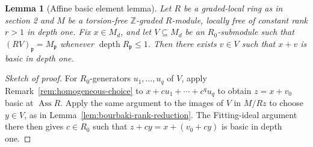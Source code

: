 \documentclass[11pt,letterpaper]{amsart}
\DeclareMathOperator{\Ass}{Ass}
\DeclareMathOperator{\depth}{depth}
\theoremstyle{plain}
\newtheorem{lem}[thm]{Lemma}
\theoremstyle{definition}
\theoremstyle{remark}
\begin{document}
\begin{lem}[Affine basic element lemma]\label{affinebasiclemma}
Let $R$ be a graded-local ring as in section 2 and $M$ be a torsion-free $\mathbb Z$-graded
$R$-module, locally free of constant rank $r>1$ in depth one. Fix $x\in M_d$,
and let $V\subseteq M_d$ be an $R_0$-submodule such that
$(RV)_{\mathfrak p}=M_{\mathfrak p}$ whenever $\depth R_{\mathfrak p}\leq 1$.
Then there exists $v\in V$ such that $x+v$ is basic in depth one.
\end{lem}
\begin{proof}[Sketch of proof]
For $R_0$-generators $u_1,\ldots,u_q$ of $V$, apply Remark~\ref{rem:homogeneous-choice} to $x+cu_1+\cdots+c^qu_q$ to obtain $z=x+v_0$ basic at $\Ass R$.
Apply the same argument to the images of $V$ in $M/Rz$ to choose $y\in V$, as in Lemma~\ref{lem:bourbaki-rank-reduction}.
The Fitting-ideal argument there then gives $c\in R_0$ such that $z+cy=x+(v_0+cy)$ is basic in depth one.
\end{proof}

\end{document}

